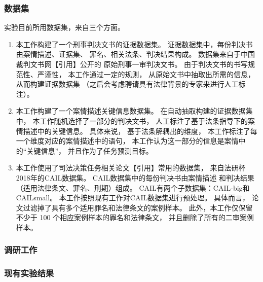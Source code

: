 \subsubsection{数据集}
实验目前所用数据集，来自三个方面。
\begin{enumerate}
    \item
          本工作构建了一个刑事判决文书的证据数据集。
          证据数据集中，每份判决书由案情描述、证据集、
          罪名、相关法条、判决结果构成。
          数据集来自于中国裁判文书网【引用】公开的
          原始刑事一审判决文书。
          由于判决文书的书写规范性、严谨性，
          本工作通过一定的规则，
          从原始文书中抽取出所需的信息，
          从而构建证据数据集
          （之后会考虑聘请具有法律背景的专家来进行人工标注）。
    \item
          本工作构建了一个案情描述关键信息数据集。
          在自动抽取构建的证据数据集中，
          本工作随机选择了一部分的判决文书，
          人工标注了基于法条指导下的案情描述中的关键信息。
          具体来说，
          基于法条解耦出的维度，
          本工作标注了每一个维度对应的案情描述中的语句，
          本工作认为这一部分的信息是案情中的“关键信息”，
          并且作为了任务预测目标。
    \item
          本工作使用了司法决策任务相关论文【引用】常用的数据集，
          来自法研杯2018年的CAIL数据集。
          CAIL数据集中的每份判决书由案情描述
          和判决结果（适用法律条文、罪名、刑期）组成。
          CAIL有两个子数据集：CAIL-big和CAILsmall。
          本工作按照现有工作对CAIL数据集进行预处理。
          具体而言，
          论文过滤掉了具有多个适用罪名和法律条文的案例样本。
          此外，本工作仅保留不少于 100 个相应案例样本的罪名和法律条文，
          并且删除了所有的二审案例样本。

\end{enumerate}
\subsubsection{调研工作}


\subsubsection{现有实验结果}


